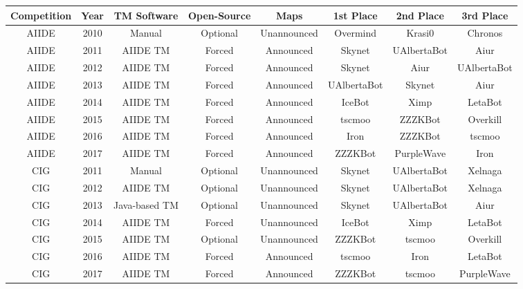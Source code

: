 
\begin{table}[t] 
 
 \begin{center}
 \begin{tabular} {| c | c | c c c | c c c |}
 \hline
 Competition & Year & TM Software & Open-Source & Maps & 1st Place & 2nd Place & 3rd Place\\
 \hline
 AIIDE & 2010 & Manual & Optional & Unannounced & Overmind & Krasi0 & Chronos \\
 \hline
 AIIDE & 2011 & AIIDE TM & Forced & Announced & Skynet & UAlbertaBot & Aiur \\
 \hline
 AIIDE & 2012 & AIIDE TM & Forced & Announced & Skynet & Aiur & UAlbertaBot\\
\hline
 AIIDE & 2013 & AIIDE TM & Forced & Announced & UAlbertaBot & Skynet & Aiur\\
\hline
 AIIDE & 2014 & AIIDE TM & Forced & Announced & IceBot & Ximp & LetaBot\\
\hline
 AIIDE & 2015 & AIIDE TM & Forced & Announced & tscmoo & ZZZKBot & Overkill\\
\hline
 AIIDE & 2016 & AIIDE TM & Forced & Announced & Iron & ZZZKBot & tscmoo\\
\hline
 AIIDE & 2017 & AIIDE TM & Forced & Announced & ZZZKBot & PurpleWave & Iron\\
\hline
 CIG & 2011 & Manual & Optional & Unannounced & Skynet & UAlbertaBot & Xelnaga\\
 \hline
 CIG & 2012 & AIIDE TM & Optional & Unannounced & Skynet & UAlbertaBot & Xelnaga\\
 \hline
 CIG & 2013 & Java-based TM & Optional & Unannounced & Skynet & UAlbertaBot & Aiur\\
 \hline
 CIG & 2014 & AIIDE TM & Forced & Unannounced & IceBot & Ximp & LetaBot\\
 \hline
 CIG & 2015 & AIIDE TM & Optional & Unannounced & ZZZKBot & tscmoo & Overkill\\
 \hline
 CIG & 2016 & AIIDE TM & Forced & Announced & tscmoo & Iron & LetaBot\\ 
 \hline
 CIG & 2017 & AIIDE TM & Forced & Announced & ZZZKBot & tscmoo & PurpleWave\\ 
 \hline   


\end{tabular}
\end{center}
\end{table}
